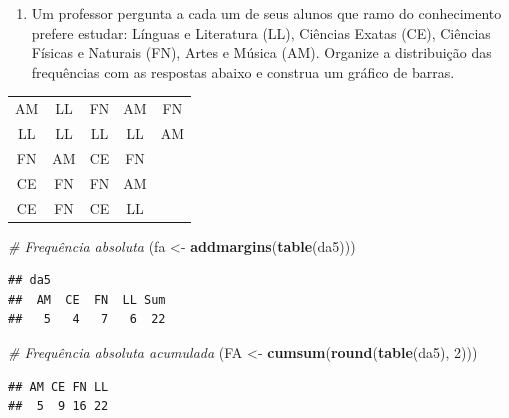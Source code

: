 \documentclass[]{article}
\newenvironment{Shaded}{\begin{snugshade}}{\end{snugshade}}
\newcommand{\KeywordTok}[1]{\textcolor[rgb]{0.13,0.29,0.53}{\textbf{#1}}}
\newcommand{\DecValTok}[1]{\textcolor[rgb]{0.00,0.00,0.81}{#1}}
\newcommand{\StringTok}[1]{\textcolor[rgb]{0.31,0.60,0.02}{#1}}
\newcommand{\CommentTok}[1]{\textcolor[rgb]{0.56,0.35,0.01}{\textit{#1}}}
\newcommand{\NormalTok}[1]{#1}
\providecommand{\tightlist}{%
  \setlength{\itemsep}{0pt}\setlength{\parskip}{0pt}}
\begin{document}
\begin{enumerate}
\def\labelenumi{\arabic{enumi}.}
\setcounter{enumi}{4}
\tightlist
\item
  Um professor pergunta a cada um de seus alunos que ramo do
  conhecimento prefere estudar: Línguas e Literatura (LL), Ciências
  Exatas (CE), Ciências Físicas e Naturais (FN), Artes e Música (AM).
  Organize a distribuição das frequências com as respostas abaixo e
  construa um gráfico de barras.
\end{enumerate}

\begin{table}[H]
\centering
\begin{tabular}{ccccc}
\hline
AM & LL & FN & AM & FN \\
LL & LL & LL & LL & AM \\
FN & AM & CE & FN &    \\
CE & FN & FN & AM &    \\
CE & FN & CE & LL &    \\ \hline
\end{tabular}
\end{table}

\begin{Shaded}
\begin{Highlighting}[]
\CommentTok{# Frequência absoluta}
\NormalTok{(fa <-}\StringTok{ }\KeywordTok{addmargins}\NormalTok{(}\KeywordTok{table}\NormalTok{(da5)))}
\end{Highlighting}
\end{Shaded}

\begin{verbatim}
## da5
##  AM  CE  FN  LL Sum 
##   5   4   7   6  22
\end{verbatim}

\begin{Shaded}
\begin{Highlighting}[]
\CommentTok{# Frequência absoluta acumulada}
\NormalTok{(FA <-}\StringTok{ }\KeywordTok{cumsum}\NormalTok{(}\KeywordTok{round}\NormalTok{(}\KeywordTok{table}\NormalTok{(da5), }\DecValTok{2}\NormalTok{)))}
\end{Highlighting}
\end{Shaded}

\begin{verbatim}
## AM CE FN LL 
##  5  9 16 22
\end{verbatim}
\end{document}
